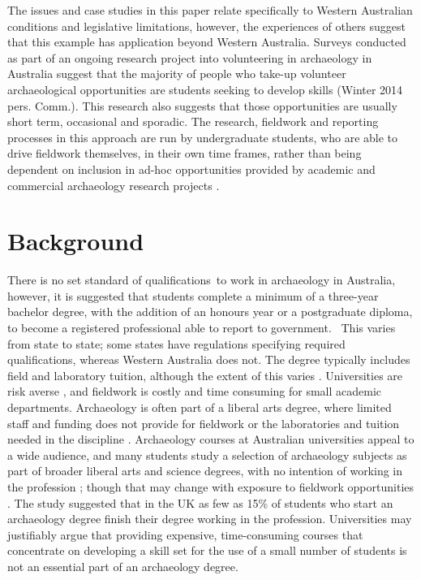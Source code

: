 \documentclass{ijsra}
\begin{document}
The issues and case studies in this paper relate specifically to Western Australian conditions and legislative limitations, however, the experiences of others \parencites[e.g.][]{boytner2012}{mytum2012a}{mytum2012b}{scarlett2012} suggest that this example has application beyond Western Australia.
Surveys conducted as part of an ongoing research project into volunteering in archaeology in Australia suggest that the majority of people who take-up volunteer archaeological opportunities are students seeking to develop skills (Winter 2014 pers. Comm.).%
This research also suggests that those opportunities are usually short term, occasional and sporadic. 
The research, fieldwork and reporting processes in this approach are run by undergraduate students, who are able to drive fieldwork themselves, in their own time frames, rather than being dependent on inclusion in ad-hoc opportunities provided by academic and commercial archaeology research projects \parencites[see][90]{boytner2012}[222]{clark2012}[70-72]{colley2012}. 

\section{Background}

There is no set standard of qualifications to work in archaeology in Australia, however, it is suggested that students complete a minimum of a three-year bachelor degree, with the addition of an honours year or a postgraduate diploma, to become a registered professional able to report to government. 
This varies from state to state; some states have regulations specifying required qualifications, whereas Western Australia does not. 
The degree typically includes field and laboratory tuition, although the extent of this varies \parencite{gibbs2005}. 
Universities are risk averse \parencite[6]{boytner2012}, and fieldwork is costly and time consuming for small academic departments. 
Archaeology is often part of a liberal arts degree, where limited staff and funding does not provide for fieldwork or the laboratories and tuition needed in the discipline \parencites{colley2004}{colley2012}{gibbs2005}{cosgrove2013}. 
Archaeology courses at Australian universities appeal to a wide audience, and many students study a selection of archaeology subjects as part of broader liberal arts and science degrees, with no intention of working in the profession \parencites[28]{gibbs2005}[44]{cosgrove2013}; 
though that may change with exposure to fieldwork opportunities \parencite[29]{cobb2012}. 
The \textcite[31]{cobb2012} study suggested that in the UK as few as 15\% of students who start an archaeology degree finish their degree working in the profession. 
Universities may justifiably argue that providing expensive, time-consuming courses that concentrate on developing a skill set for the use of a small number of students is not an essential part of an archaeology degree.
\end{document}
